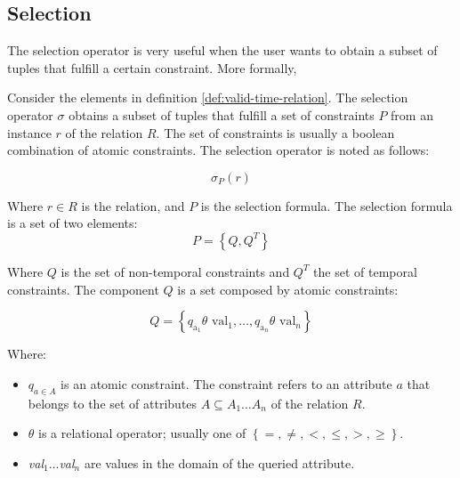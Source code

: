 \subsection{\label{sec:selection}Selection}
The selection operator is very useful when the user wants to obtain a subset of tuples that fulfill a certain constraint. More formally,

\begin{definition}
\label{def:crisp-selection}
 Consider the elements in definition \ref{def:valid-time-relation}.
The selection operator $\sigma$ obtains a subset of tuples that fulfill a set of constraints $P$ from an instance $r$ of the relation $R$. The set of constraints is usually a boolean combination of atomic constraints. The selection operator is noted as follows:
\end{definition}

\begin{equation}
 \label{eq:selection}
\sigma_{P} \left( r \right)
\end{equation}

Where $r \in R$ is the relation, and $P$ is the selection formula. The selection formula is a set of two elements:
\begin{equation}
 \label{eq:selection_formula}
P = \left \lbrace Q, Q^{T}\right \rbrace
\end{equation}

Where $Q$ is the set of non-temporal constraints and $Q^{T}$ the set of temporal constraints.
The component $Q$ is a set composed by atomic constraints: 

\begin{equation}
 \label{eq:non-temporal-constraints}
Q = \left \lbrace q_{\mbox{a}_1}  \theta \mbox{ val}_1, \ldots, q_{\mbox{a}_n}  \theta \mbox{ val}_n \right \rbrace
\end{equation}


Where:
\begin{itemize}
 \item $q_{a \in A }$ is an atomic constraint. The constraint refers to an attribute $a$ that belongs to the set of attributes $A \subseteq A_1 \ldots A_n $ of the relation $R$.
\item $\theta$ is a relational operator; usually one of $\left \lbrace =, \neq, <, \leq, >, \geq \right \rbrace$.
\item \emph{val}$_1 \ldots$\emph{val}$_n$ are values in the domain of the queried attribute. 
 \end{itemize}

